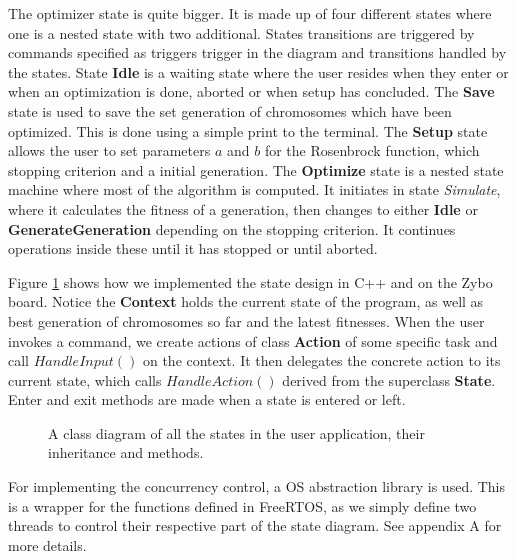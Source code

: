 The optimizer state is quite bigger. It is made up of four different states where one is a nested state with two additional.
States transitions are triggered by commands specified as triggers trigger in the diagram and transitions handled by the states. State \textbf{Idle} is a waiting state where the user resides when they enter or when an optimization is done, aborted or when setup has concluded. The \textbf{Save} state is used to save the set generation of chromosomes which have been optimized. This is done using a simple print to the terminal. The \textbf{Setup} state allows the user to set parameters $a$ and $b$ for the Rosenbrock function, which stopping criterion and a initial generation. The \textbf{Optimize} state is a nested state machine where most of the algorithm is computed. It initiates in state \emph{Simulate}, where it calculates the fitness of a generation, then changes to either \textbf{Idle} or \textbf{GenerateGeneration} depending on the stopping criterion. It continues operations inside these until it has stopped or until aborted.

Figure \ref{fig:classdiagram} shows how we implemented the state design in C++ and on the Zybo board. Notice the \textbf{Context} holds the current state of the program, as well as best generation of chromosomes so far and the latest fitnesses. When the user invokes a command, we create actions of class \textbf{Action} of some specific task and call $HandleInput()$ on the context. It then delegates the concrete action to its current state, which calls $HandleAction()$ derived from the superclass \textbf{State}. Enter and exit methods are made when a state is entered or left.

\begin{figure}[h]
	\centering
	\caption{A class diagram of all the states in the user application, their inheritance and methods.}
	\label{fig:classdiagram}
\end{figure}

For implementing the concurrency control, a OS abstraction library is used. This is a wrapper for the functions defined in FreeRTOS, as we simply define two threads to control their respective part of the state diagram. See appendix A for more details.


